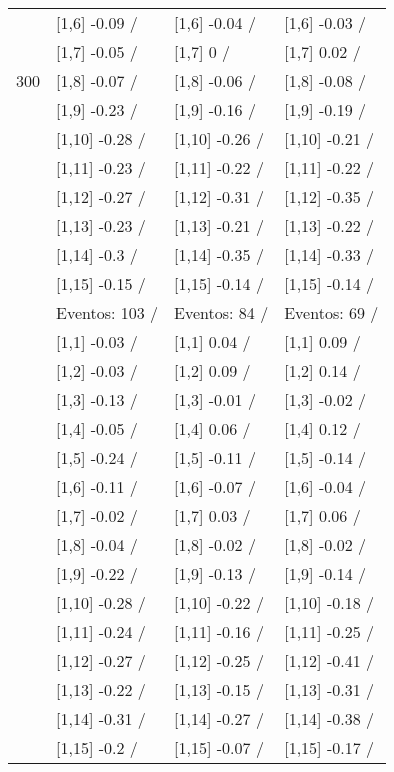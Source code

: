 \begin{table}
\begin{tabular}[t]{llll}
 & {}[1,6] -0.09  / & {}[1,6] -0.04  / & {}[1,6] -0.03  /\\
 & {}[1,7] -0.05  / & {}[1,7] 0  / & {}[1,7] 0.02  /\\
300 & {}[1,8] -0.07  / & {}[1,8] -0.06  / & {}[1,8] -0.08  /\\
\addlinespace
 & {}[1,9] -0.23  / & {}[1,9] -0.16  / & {}[1,9] -0.19  /\\
 & {}[1,10] -0.28  / & {}[1,10] -0.26  / & {}[1,10] -0.21  /\\
 & {}[1,11] -0.23  / & {}[1,11] -0.22  / & {}[1,11] -0.22  /\\
 & {}[1,12] -0.27  / & {}[1,12] -0.31  / & {}[1,12] -0.35  /\\
 & {}[1,13] -0.23  / & {}[1,13] -0.21  / & {}[1,13] -0.22  /\\
\addlinespace
 & {}[1,14] -0.3  / & {}[1,14] -0.35  / & {}[1,14] -0.33  /\\
 & {}[1,15] -0.15  / & {}[1,15] -0.14  / & {}[1,15] -0.14  /\\
 & Eventos:  103 / & Eventos:  84 / & Eventos:  69 /\\
 & {}[1,1] -0.03  / & {}[1,1] 0.04  / & {}[1,1] 0.09  /\\
 & {}[1,2] -0.03  / & {}[1,2] 0.09  / & {}[1,2] 0.14  /\\
\addlinespace
 & {}[1,3] -0.13  / & {}[1,3] -0.01  / & {}[1,3] -0.02  /\\
 & {}[1,4] -0.05  / & {}[1,4] 0.06  / & {}[1,4] 0.12  /\\
 & {}[1,5] -0.24  / & {}[1,5] -0.11  / & {}[1,5] -0.14  /\\
 & {}[1,6] -0.11  / & {}[1,6] -0.07  / & {}[1,6] -0.04  /\\
 & {}[1,7] -0.02  / & {}[1,7] 0.03  / & {}[1,7] 0.06  /\\
\addlinespace
500 & {}[1,8] -0.04  / & {}[1,8] -0.02  / & {}[1,8] -0.02  /\\
 & {}[1,9] -0.22  / & {}[1,9] -0.13  / & {}[1,9] -0.14  /\\
 & {}[1,10] -0.28  / & {}[1,10] -0.22  / & {}[1,10] -0.18  /\\
 & {}[1,11] -0.24  / & {}[1,11] -0.16  / & {}[1,11] -0.25  /\\
 & {}[1,12] -0.27  / & {}[1,12] -0.25  / & {}[1,12] -0.41  /\\
\addlinespace
 & {}[1,13] -0.22  / & {}[1,13] -0.15  / & {}[1,13] -0.31  /\\
 & {}[1,14] -0.31  / & {}[1,14] -0.27  / & {}[1,14] -0.38  /\\
 & {}[1,15] -0.2  / & {}[1,15] -0.07  / & {}[1,15] -0.17  /\\
\bottomrule
\end{tabular}
\end{table}
